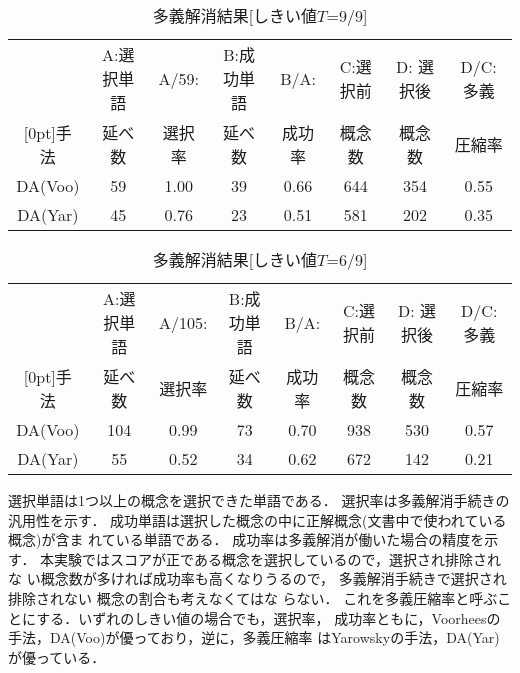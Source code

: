 {
\small
\begin{table}[h]
\caption{多義解消結果[しきい値$T$=9/9]}
\label{tbl:disamb-result9/9}
\small
\begin{center}
\renewcommand{\arraystretch}{}
\tabcolsep=1.5mm
\begin{tabular}{|c||c|c||c|c||c|c|c|}\hline
         & A:選択単語 & A/59: & B:成功単語 & B/A:   & C:選択前     & D:
         選択後 & D/C:多義 \\[-0.2zh]
 \raisebox{0.8zh}[0pt]{手法} & 延べ数  & 選択率& 延べ数     & 成功率 & 概念数     & 概念数 & 圧縮率 \\\hline\hline
 DA(Voo) &  59       & 1.00  & 39         & 0.66   &  644       & 354    & 0.55 \\\hline 
 DA(Yar) &   45       & 0.76  & 23         & 0.51   &  581       & 202    & 0.35 \\\hline 
\end{tabular}
\end{center}
\end{table}

\vspace{-3mm}

\begin{table}[h]
\caption{多義解消結果[しきい値$T$=6/9]}
\label{tbl:disamb-result6/9}
\small
\begin{center}
\renewcommand{\arraystretch}{}
\tabcolsep=1.5mm
\begin{tabular}{|c||c|c||c|c||c|c|c|}\hline
         & A:選択単語 & A/105: & B:成功単語 & B/A:   & C:選択前     & D:
         選択後 & D/C:多義 \\[-0.2zh]
 \raisebox{0.8zh}[0pt]{手法} & 延べ数     & 選択率& 延べ数     & 成功率 & 概念数     & 概念数 & 圧縮率 \\\hline\hline
 DA(Voo) &  104       & 0.99  & 73         & 0.70   &  938       & 530    & 0.57 \\\hline 
 DA(Yar) &   55       & 0.52  & 34         & 0.62   &  672       & 142    & 0.21 \\\hline 
\end{tabular}
\end{center}
\end{table}
}

  選択単語は1つ以上の概念を選択できた単語である．
  選択率は多義解消手続きの汎用性を示す．
  成功単語は選択した概念の中に正解概念(文書中で使われている概念)が含ま
  れている単語である．
  成功率は多義解消が働いた場合の精度を示す．
  本実験ではスコアが正である概念を選択しているので，選択され排除されな
  い概念数が多ければ成功率も高くなりうるので，
  多義解消手続きで選択され排除されない
  概念の割合も考えなくてはな
  らない．
  これを多義圧縮率と呼ぶことにする．いずれのしきい値の場合でも，選択率，
  成功率ともに，Voorheesの手法，DA(Voo)が優っており，逆に，多義圧縮率
  はYarowskyの手法，DA(Yar)が優っている．

